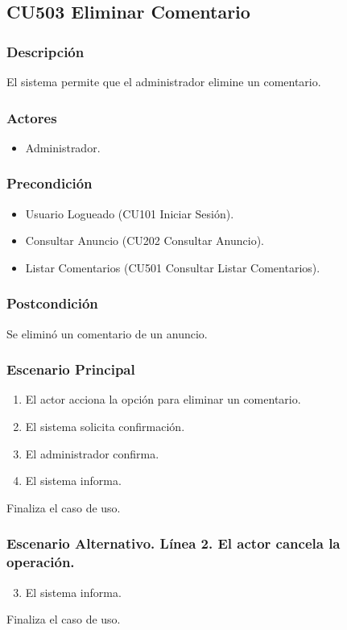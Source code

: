 \subsection{CU503 Eliminar Comentario}
\subsubsection{Descripci\'{o}n}
El sistema permite que el administrador elimine un comentario.
\subsubsection{Actores}
\begin{itemize}
\item Administrador.
\end{itemize}
\subsubsection{Precondici\'{o}n}
\begin{itemize}
\item Usuario Logueado (CU101 Iniciar Sesi\'{o}n).
\item Consultar Anuncio (CU202 Consultar Anuncio).
\item Listar Comentarios (CU501 Consultar Listar Comentarios).
\end{itemize}
\subsubsection{Postcondici\'{o}n}
Se elimin\'{o} un comentario de un anuncio.
\subsubsection{Escenario Principal}
\begin{enumerate}
\item El actor acciona la opci\'{o}n para eliminar un comentario.
\item El sistema solicita confirmaci\'{o}n.
\item El administrador confirma.
\item El sistema informa.
\end{enumerate}
Finaliza el caso de uso.
\subsubsection{Escenario Alternativo. L\'{i}nea 2. El actor cancela la operaci\'{o}n.}
\begin{enumerate}
\setcounter{enumi}{2}
\item El sistema informa.
\end{enumerate}
Finaliza el caso de uso.
